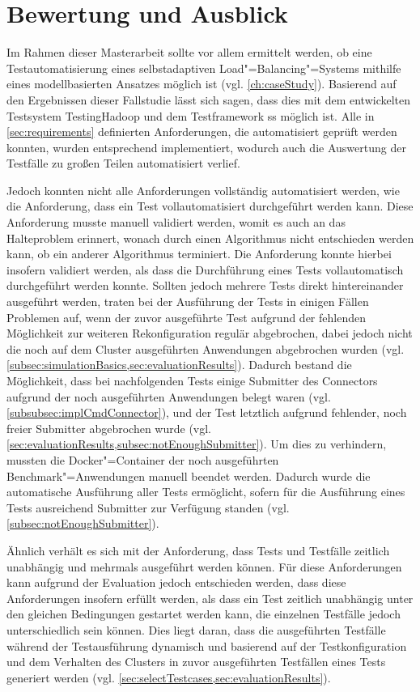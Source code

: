 \section{Bewertung und Ausblick}
\label{sec:outlook}

Im Rahmen dieser Masterarbeit sollte vor allem ermittelt werden, ob eine Testautomatisierung eines selbstadaptiven Load"=Balancing"=Systems mithilfe eines modellbasierten Ansatzes möglich ist (vgl. \cref{ch:caseStudy}).
Basierend auf den Ergebnissen dieser Fallstudie lässt sich sagen, dass dies mit dem entwickelten Testsystem TestingHadoop und dem Testframework \gls{ss} möglich ist.
Alle in \cref{sec:requirements} definierten Anforderungen, die automatisiert geprüft werden konnten, wurden entsprechend implementiert, wodurch auch die Auswertung der Testfälle zu großen Teilen automatisiert verlief.

Jedoch konnten nicht alle Anforderungen vollständig automatisiert werden, wie \zB die Anforderung, dass ein Test vollautomatisiert durchgeführt werden kann.
Diese Anforderung musste manuell validiert werden, womit es auch an das Halteproblem \cite{Turing1937,Turing1938} erinnert, wonach durch einen Algorithmus nicht entschieden werden kann, ob ein anderer Algorithmus terminiert.
Die Anforderung konnte hierbei insofern validiert werden, als dass die Durchführung eines Tests vollautomatisch durchgeführt werden konnte.
Sollten jedoch mehrere Tests direkt hintereinander ausgeführt werden, traten bei der Ausführung der Tests in einigen Fällen Problemen auf, wenn der zuvor ausgeführte Test aufgrund der fehlenden Möglichkeit zur weiteren Rekonfiguration regulär abgebrochen, dabei jedoch nicht die noch auf dem Cluster ausgeführten Anwendungen abgebrochen wurden (vgl. \cref{subsec:simulationBasics,sec:evaluationResults}).
Dadurch bestand die Möglichkeit, dass bei nachfolgenden Tests einige Submitter des Connectors aufgrund der noch ausgeführten Anwendungen belegt waren (vgl. \cref{subsubsec:implCmdConnector}), und der Test letztlich aufgrund fehlender, noch freier Submitter abgebrochen wurde (vgl. \cref{sec:evaluationResults,subsec:notEnoughSubmitter}).
Um dies zu verhindern, mussten die Docker"=Container der noch ausgeführten Benchmark"=Anwendungen manuell beendet werden.
Dadurch wurde die automatische Ausführung aller Tests ermöglicht, sofern für die Ausführung eines Tests ausreichend Submitter zur Verfügung standen (vgl. \cref{subsec:notEnoughSubmitter}).

Ähnlich verhält es sich mit der Anforderung, dass Tests und Testfälle zeitlich unabhängig und mehrmals ausgeführt werden können.
Für diese Anforderungen kann aufgrund der Evaluation jedoch entschieden werden, dass diese Anforderungen insofern erfüllt werden, als dass ein Test zeitlich unabhängig unter den gleichen Bedingungen gestartet werden kann, die einzelnen Testfälle jedoch unterschiedlich sein können.
Dies liegt daran, dass die ausgeführten Testfälle während der Testausführung dynamisch und basierend auf der Testkonfiguration und dem Verhalten des Clusters in zuvor ausgeführten Testfällen eines Tests generiert werden (vgl. \cref{sec:selectTestcases,sec:evaluationResults}).

